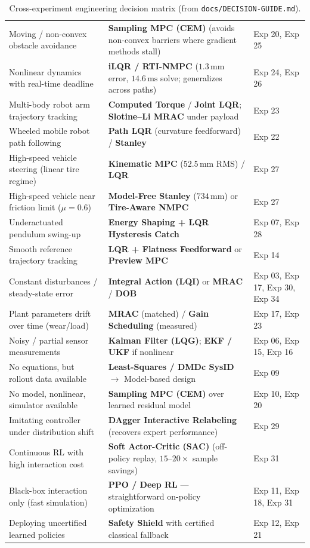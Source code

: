 \documentclass[11pt,a4paper]{article}
\begin{document}
\begin{table}[H]
{\begin{tabular}{@{}p{}p{}p{}@{}}
Moving / non-convex obstacle avoidance & \textbf{Sampling MPC (CEM)} (avoids non-convex barriers where gradient methods stall) & Exp 20, Exp 25 \\
Nonlinear dynamics with real-time deadline & \textbf{iLQR / RTI-NMPC} ($1.3\,\text{mm}$ error, $14.6\,\text{ms}$ solve; generalizes across paths) & Exp 24, Exp 26 \\
Multi-body robot arm trajectory tracking & \textbf{Computed Torque} / \textbf{Joint LQR}; \textbf{Slotine--Li MRAC} under payload & Exp 23 \\
Wheeled mobile robot path following & \textbf{Path LQR} (curvature feedforward) / \textbf{Stanley} & Exp 22 \\
High-speed vehicle steering (linear tire regime) & \textbf{Kinematic MPC} ($52.5\,\text{mm}$ RMS) / \textbf{LQR} & Exp 27 \\
High-speed vehicle near friction limit ($\mu=0.6$) & \textbf{Model-Free Stanley} ($734\,\text{mm}$) or \textbf{Tire-Aware NMPC} & Exp 27 \\
Underactuated pendulum swing-up & \textbf{Energy Shaping + LQR Hysteresis Catch} & Exp 07, Exp 28 \\
Smooth reference trajectory tracking & \textbf{LQR + Flatness Feedforward} or \textbf{Preview MPC} & Exp 14 \\
Constant disturbances / steady-state error & \textbf{Integral Action (LQI)} or \textbf{MRAC} / \textbf{DOB} & Exp 03, Exp 17, Exp 30, Exp 34 \\
Plant parameters drift over time (wear/load) & \textbf{MRAC} (matched) / \textbf{Gain Scheduling} (measured) & Exp 17, Exp 23 \\
Noisy / partial sensor measurements & \textbf{Kalman Filter (LQG)}; \textbf{EKF / UKF} if nonlinear & Exp 06, Exp 15, Exp 16 \\
No equations, but rollout data available & \textbf{Least-Squares / DMDc SysID} $\to$ Model-based design & Exp 09 \\
No model, nonlinear, simulator available & \textbf{Sampling MPC (CEM)} over learned residual model & Exp 10, Exp 20 \\
Imitating controller under distribution shift & \textbf{DAgger Interactive Relabeling} (recovers expert performance) & Exp 29 \\
Continuous RL with high interaction cost & \textbf{Soft Actor-Critic (SAC)} (off-policy replay, $15\text{--}20\times$ sample savings) & Exp 31 \\
Black-box interaction only (fast simulation) & \textbf{PPO / Deep RL} --- straightforward on-policy optimization & Exp 11, Exp 18, Exp 31 \\
Deploying uncertified learned policies & \textbf{Safety Shield} with certified classical fallback & Exp 12, Exp 21 \\
\bottomrule
\end{tabular}%
}
\caption{Cross-experiment engineering decision matrix (from \texttt{docs/DECISION-GUIDE.md}).}
\label{tab:decision_guide}
\end{table}
\end{document}
